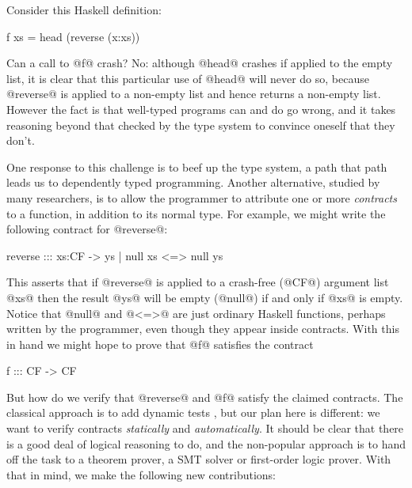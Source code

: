Consider this Haskell definition:
\begin{code}
  f xs = head (reverse (x:xs))
\end{code}
Can a call to @f@ crash?  No: although @head@ crashes if applied to the
empty list, it is clear that this particular use of @head@ will never
do so, because @reverse@ is applied to a non-empty list and
hence returns a non-empty list.  However the fact is that 
well-typed programs can and do go wrong, and it takes reasoning beyond that
checked by the type system to convince oneself that they don't.

One response to this challenge is to beef up the type system, a path that
path leads us to dependently typed programming.  Another alternative,
studied by many researchers, is to allow the programmer to attribute one or
more \emph{contracts} to a function, in addition to its normal type.
For example, we might write the following contract for @reverse@:
\begin{code}
reverse ::: xs:CF -> { ys | null xs <=> null ys }
\end{code}
This asserts that if @reverse@ is applied to a crash-free (@CF@) argument list @xs@
then the result @ys@ will be empty (@null@) if and only if @xs@ is empty.
Notice that @null@ and @<=>@ are just ordinary Haskell functions, perhaps
written by the programmer, even though they appear inside contracts.
With this in hand we might hope to prove that @f@ satisfies the contract
\begin{code}
f ::: CF -> CF
\end{code}
But how do we verify that @reverse@ and @f@ satisfy the claimed
contracts.  The classical approach is to add dynamic tests
\cite{finder-felliesen}, but our plan here is different: we want to
verify contracts \emph{statically} and \emph{automatically}.  It
should be clear that there is a good deal of logical reasoning to do,
and the non-popular approach is to hand off the task to a theorem
prover, a SMT solver or first-order logic prover.
With that in mind, we make the following new contributions:
